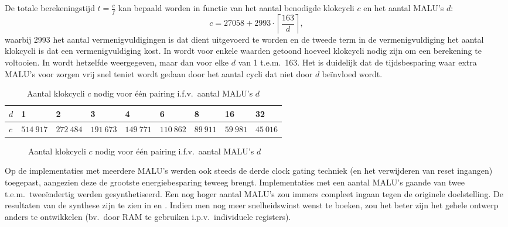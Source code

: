 De totale berekeningstijd $t = \frac{c}{f}$ kan bepaald worden in functie van het aantal benodigde klokcycli $c$ en het aantal MALU's $d$:
\[c = 27058 + 2993 \cdot \left\lceil \frac{163}{d} \right\rceil,\]
waarbij 2993 het aantal vermenigvuldigingen is dat dient uitgevoerd te worden en de tweede term in de vermenigvuldiging het aantal klokcycli is dat een vermenigvuldiging kost. In  wordt voor enkele waarden getoond hoeveel klokcycli nodig zijn om een berekening te voltooien. In  wordt hetzelfde weergegeven, maar dan voor elke $d$ van 1 t.e.m.\ 163. Het is duidelijk dat de tijdsbesparing waar extra MALU's voor zorgen vrij snel teniet wordt gedaan door het aantal cycli dat niet door $d$ be\"invloed wordt.

\begin{table}[h]
	\caption{Aantal klokcycli $c$ nodig voor \'e\'en pairing i.f.v.\ aantal MALU's $d$}
	\label{tabel-resultaten-multi-cycles}

	\centering
	\begin{tabular}{|l||l|l|l|l|l|l|l|l|}
		\hline
		$d$	& 1	& 2	& 3	& 4	& 6	& 8	& 16	& 32\\
		\hline
		$c$	& $514\:917$	& $272\:484$	& $191\:673$	& $149\:771$	& $110\:862$	& $89\:911$	& $59\:981$	& $45\:016$\\
		\hline		
	\end{tabular}
\end{table}

\begin{figure}[h]
	\centering
		\caption{Aantal klokcycli $c$ nodig voor \'e\'en pairing i.f.v.\ aantal MALU's $d$\label{figuur-resultaten-multi-cycles}}
\end{figure}

Op de implementaties met meerdere MALU's werden ook steeds de derde clock gating techniek (en het verwijderen van reset ingangen) toegepast, aangezien deze de grootste energiebesparing teweeg brengt. Implementaties met een aantal MALU's gaande van twee t.e.m.\ twee\"endertig werden gesynthetiseerd. Een nog hoger aantal MALU's zou immers compleet ingaan tegen de originele doelstelling. De resultaten van de synthese zijn te zien in  en . Indien men nog meer snelheidswinst wenst te boeken, zou het beter zijn het gehele ontwerp anders te ontwikkelen (bv.\ door RAM te gebruiken i.p.v.\ individuele registers).

